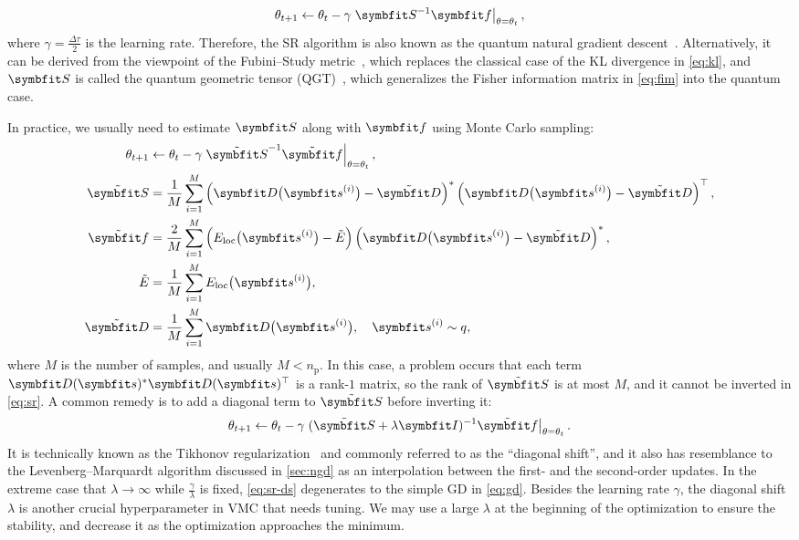 \begin{equation}
\theta_{t + 1} \gets \theta_t - \gamma \left. \mS^{-1} \vf \right|_{\theta = \theta_t},
\label{eq:sr}
\end{equation}
where $\gamma = \frac{\Delta \tau}{2}$ is the learning rate. Therefore, the SR algorithm is also known as the quantum natural gradient descent~\cite{stokes2020quantum}. Alternatively, it can be derived from the viewpoint of the Fubini--Study metric~\cite{study1905kurzeste}, which replaces the classical case of the KL divergence in \cref{eq:kl}, and $\mS$ is called the quantum geometric tensor (QGT)~\cite{berry1989quantum}, which generalizes the Fisher information matrix in \cref{eq:fim} into the quantum case.

In practice, we usually need to estimate $\mS$ along with $\vf$ using Monte Carlo sampling:
\begin{align}
\theta_{t + 1} &\gets \theta_t - \gamma \left. \tilde{\mS}^{-1} \tilde{\vf} \right|_{\theta = \theta_t}, \\
\tilde{\mS} &= \frac{1}{M} \sum_{i = 1}^M
\left( \vD\big( \vs^{(i)} \big) - \tilde{\vD} \right)^*
\left( \vD\big( \vs^{(i)} \big) - \tilde{\vD} \right)^\transpose, \label{eq:qgt-mc} \\
\tilde{\vf} &= \frac{2}{M} \sum_{i = 1}^M
\left( E_\text{loc}\big( \vs^{(i)} \big) - \tilde{E} \right)
\left( \vD\big( \vs^{(i)} \big) - \tilde{\vD} \right)^*, \\
\tilde{E} &= \frac{1}{M} \sum_{i = 1}^M E_\text{loc}\big( \vs^{(i)} \big), \\
\tilde{\vD} &= \frac{1}{M} \sum_{i = 1}^M \vD\big( \vs^{(i)} \big), \quad
\vs^{(i)} \sim q,
\end{align}
where $M$ is the number of samples, and usually $M < n_\text{p}$. In this case, a problem occurs that each term $\vD(\vs)^* \vD(\vs)^\transpose$ is a rank-$1$ matrix, so the rank of $\tilde{\mS}$ is at most $M$, and it cannot be inverted in \cref{eq:sr}. A common remedy is to add a diagonal term to $\tilde{\mS}$ before inverting it:
\begin{equation}
\theta_{t + 1} \gets \theta_t - \gamma \left. (\tilde{\mS} + \lambda \mI)^{-1} \tilde{\vf} \right|_{\theta = \theta_t}.
\label{eq:sr-ds}
\end{equation}
It is technically known as the Tikhonov regularization~\cite{tikhonov1943stability} and commonly referred to as the ``diagonal shift'', and it also has resemblance to the Levenberg--Marquardt algorithm discussed in \cref{sec:ngd} as an interpolation between the first- and the second-order updates. In the extreme case that $\lambda \to \infty$ while $\frac{\gamma}{\lambda}$ is fixed, \cref{eq:sr-ds} degenerates to the simple GD in \cref{eq:gd}. Besides the learning rate $\gamma$, the diagonal shift $\lambda$ is another crucial hyperparameter in VMC that needs tuning. We may use a large $\lambda$ at the beginning of the optimization to ensure the stability, and decrease it as the optimization approaches the minimum.

